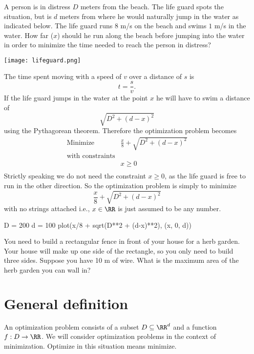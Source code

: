 \documentclass{article}
\begin{document}
\begin{example}
  A person is in distress $D$ meters from the beach. The life guard
  spots the situation, but is $d$ meters from where he would naturally jump
  in the water as indicated below. The life guard runs $8$ m/s on the
  beach and swims $1$ m/s in the water. How far ($x$) should he run along the
  beach before jumping into the water in order to minimize the time needed
  to reach the person in distress?
  
  \texttt{[image: lifeguard.png]}

  The time spent moving with a speed of $v$ over a distance of $s$ is
  $$
  t = \frac{s}{v}.
  $$
  If the life guard jumps in the water at the point $x$ he will have
  to swim a distance of
  $$
  \sqrt{D^2 + (d-x)^2}
  $$
  using the Pythagorean theorem. Therefore the optimization problem becomes
\begin{align*}
  &\text{Minimize} &\frac{x}{8} + \sqrt{D^2 + (d-x)^2}&\\
  &\text{with constraints}\\
  &&x\geq 0\\
\end{align*}
Strictly speaking we do not need the constraint $x\geq 0$, as the life guard is free
to run in the other direction. So the optimization problem is simply to minimize
$$
\frac{x}{8} + \sqrt{D^2 + (d-x)^2}
$$
with no strings attached i.e., $x\in \RR$ is just assumed to be any number.


\begin{sage}
D = 200
d = 100
plot(x/8 + sqrt(D**2 + (d-x)**2), (x, 0, d))
\end{sage}

\end{example}


\beginshex
  You need to build a rectangular fence in front of your house for a herb garden.
  Your house will make up one side of the rectangle, so you only need to build three
  sides. Suppose you have 10 m of wire. What is the maximum area of the herb garden you can
  wall in?
\endshex


\section{General definition}

An optimization problem consists of a subset $D\subseteq \RR^d$ and
a function $f:D\rightarrow \RR$. We will consider optimization problems in the context
of minimization. Optimize in this situation means minimize.
\end{document}
